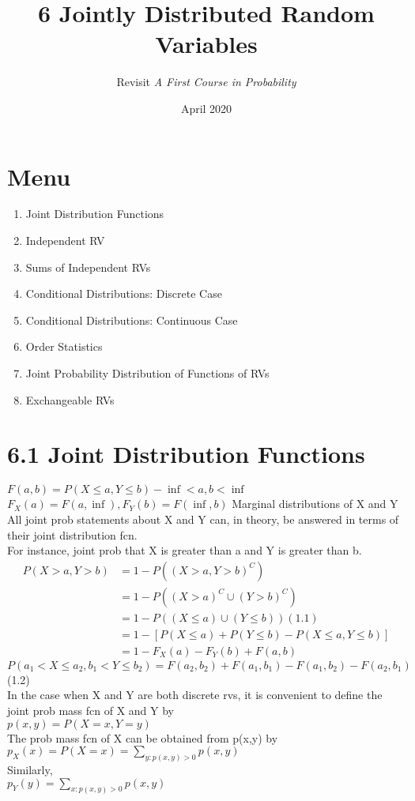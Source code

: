 \documentclass{article}
\title{6 Jointly Distributed Random Variables}
\author{Revisit \textit{A First Course in Probability}}
\date{April 2020}
\begin{document}
\maketitle

\section*{Menu}
\begin{enumerate}
\item  Joint Distribution Functions 
\item  Independent RV
\item  Sums of Independent RVs
\item  Conditional Distributions: Discrete Case 
\item  Conditional Distributions: Continuous Case 
\item  Order Statistics
\item  Joint Probability Distribution of Functions of RVs
\item  Exchangeable RVs
\end{enumerate}


\section*{6.1 Joint Distribution Functions}
$F(a,b) = P(X \leq a, Y \leq b) -\inf < a, b < \inf$ \\
$F_X(a) = F(a, \inf), F_Y(b) = F(\inf, b)$ Marginal distributions of X and Y \\ 
All joint prob statements about X and Y can, in theory, be answered in terms of their joint distribution fcn. \\
For instance, joint prob that X is greater than a and Y is greater than b. 
\begin{align*}
P(X>a, Y>b) &= 1- P((X > a, Y > b)^C) \\ 
            &= 1- P((X > a)^C \cup (Y > b)^C) \\
            &= 1 - P((X \leq a) \cup (Y \leq b))  (1.1) \\
            &= 1 - [P(X \leq a) + P(Y \leq b) - P(X \leq a, Y \leq b)]\\
            &= 1 - F_X(a) - F_Y(b) + F(a,b) 
\end{align*}
$P(a_1 < X \leq a_2, b_1 < Y \leq b_2) = F(a_2, b_2) + F(a_1, b_1) - F(a_1, b_2) - F(a_2, b_1)$ (1.2)\\ 
In the case when X and Y are both discrete rvs, it is convenient to define the joint prob mass fcn of X and Y by \\
$p(x,y) = P(X=x, Y=y)$ \\
The prob mass fcn of X can be obtained from p(x,y) by \\
$ p_X(x) = P(X=x) = \sum_{y:p(x,y) > 0}p(x,y)$ \\
Similarly, \\
$ p_Y(y) = \sum_{x:p(x,y) > 0}p(x,y)$
\end{document}

